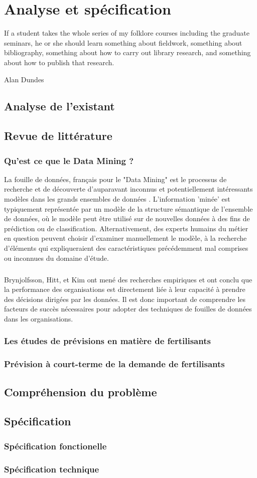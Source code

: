 \chapter{Analyse et spécification}
\epigraph{If a student takes the whole series of my folklore courses including the graduate seminars, he or she should learn something about fieldwork, something about bibliography, something about how to carry out library research, and something about how to publish that research.}{Alan Dundes}

\cleardoublepage

\section{Analyse de l’existant}
\section{Revue de littérature}
\subsection{Qu'est ce que le Data Mining ?}
La fouille de données, français pour le "Data Mining" est le processus de recherche et de découverte d'auparavant inconnus et potentiellement intéressants modèles dans les grands ensembles de données \cite{def-DM}. L'information 'minée' est typiquement représentée par un modèle de la structure sémantique de l'ensemble de données, où le modèle peut être utilisé sur de nouvelles données à des fins de prédiction ou de classification. Alternativement, des experts humains du métier en question peuvent choisir d'examiner manuellement le modèle, à la recherche d'éléments qui expliqueraient des caractéristiques précédemment mal comprises ou inconnues du domaine d'étude.
\paragraph{}
Brynjolfsson, Hitt, et Kim\cite{data-driven-des} ont mené des recherches empiriques et ont conclu que la performance des organisations est directement liée à leur capacité à prendre des décisions dirigées par les données. Il est donc important de comprendre les facteurs de succès nécessaires pour adopter des techniques de fouilles de données dans les organisations.
\subsection{Les études de prévisions en matière de fertilisants}\label{read1}
\subsection{Prévision à court-terme de la demande de fertilisants}\label{read2}
\section{Compréhension du problème}
\section{Spécification}
	\subsection{Spécification fonctionelle}
	\subsection{Spécification technique}